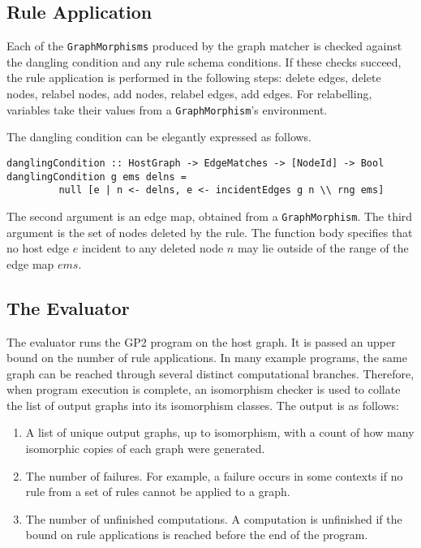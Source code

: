 \subsection{Rule Application}
Each of the \texttt{GraphMorphisms} produced by the graph matcher is checked against the dangling condition and any rule schema conditions. If these checks succeed, the rule application is performed in the following steps: delete edges, delete nodes, relabel nodes, add nodes, relabel edges, add edges. For relabelling, variables take their values from a \texttt{GraphMorphism}'s environment. 

The dangling condition can be elegantly expressed as follows.
\begin{verbatim}
danglingCondition :: HostGraph -> EdgeMatches -> [NodeId] -> Bool
danglingCondition g ems delns = 
         null [e | n <- delns, e <- incidentEdges g n \\ rng ems]
\end{verbatim}

The second argument is an edge map, obtained from a \texttt{GraphMorphism}. The third argument is the set of nodes deleted by the rule. The function body specifies that no host edge $e$ incident to any deleted node $n$ may lie outside of the range of the edge map $ems$.

\subsection{The Evaluator}\label{sec:eval}
The evaluator runs the GP2 program on the host graph. It is passed an upper bound on the number of rule applications. In many example programs, the same graph can be reached through several distinct computational branches. Therefore, when program execution is complete, an isomorphism checker is used to collate the list of output graphs into its isomorphism classes. The output is as follows:

\begin{enumerate}
\item A list of unique output graphs, up to isomorphism, with a count of how many isomorphic copies of each graph were generated.
\item The number of failures. For example, a failure occurs in some contexts if no rule from a set of rules cannot be applied to a graph.
\item The number of unfinished computations. A computation is unfinished if the bound on rule applications is reached before the end of the program.
\end{enumerate}


